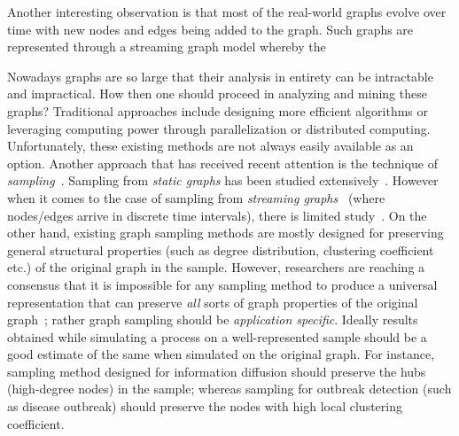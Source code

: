Another interesting observation is that most of the real-world graphs evolve over time with new nodes and edges being added to the graph. Such graphs are represented through a streaming graph model whereby the 



Nowadays graphs are so large that their analysis in entirety can be intractable and impractical. How then one should proceed in analyzing and mining these graphs? Traditional approaches include designing more efficient algorithms or leveraging computing power through parallelization or distributed computing. Unfortunately, these existing methods are not always easily available as an option. Another approach that has received recent attention is the technique of {\em sampling}~\cite{leskovec2006sampling}.
\fi
Sampling from {\em static graphs} has been studied extensively~\cite{leskovec2006sampling,gjoka2010walking,maiya2010sampling,rasti2009respondent,ribeiro2010estimating}. However when it comes to the case of sampling from {\em streaming graphs}~\cite{henzinger1998computing} (where nodes/edges arrive in discrete time intervals), there is limited study~\cite{aggarwal2011outlier,ahmed2014network,lim2015mascot,de2016tri}. On the other hand, existing graph sampling methods are mostly designed for preserving general structural properties (such as degree distribution, clustering coefficient etc.) of the original graph in the sample. However, researchers are reaching a consensus that it is impossible for any sampling method to produce a universal representation that can preserve {\em all} sorts of graph properties of the original graph~\cite{maiya2010sampling}; rather graph sampling should be {\em application specific}. 
Ideally results obtained while simulating a process on a well-represented sample should be a good estimate of the same when simulated on the original graph.
For instance, sampling method 
designed for information diffusion should preserve the hubs (high-degree nodes) in the sample; whereas sampling for outbreak detection (such as disease outbreak) should preserve the nodes with high local clustering coefficient.

